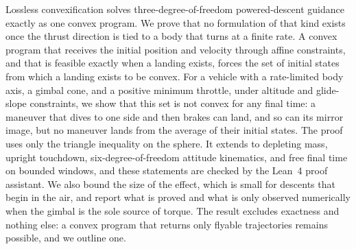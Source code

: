\begin{aiaaabstract}
Lossless convexification solves three-degree-of-freedom powered-descent guidance exactly as one convex program. We prove that
no formulation of that kind exists once the thrust direction is tied to a body that turns at a finite rate. A convex program
that receives the initial position and velocity through affine constraints, and that is feasible exactly when a landing
exists, forces the set of initial states from which a landing exists to be convex. For a vehicle with a rate-limited body
axis, a gimbal cone, and a positive minimum throttle, under altitude and glide-slope constraints, we show that this set is not
convex for any final time: a maneuver that dives to one side and then brakes can land, and so can its mirror image, but no
maneuver lands from the average of their initial states. The proof uses only the triangle inequality on the sphere. It
extends to depleting mass, upright touchdown, six-degree-of-freedom attitude kinematics, and free final time on bounded
windows, and these statements are checked by the Lean~4 proof assistant. We also bound the size of the effect, which is small
for descents that begin in the air, and report what is proved and what is only observed numerically when the gimbal is the
sole source of torque. The result excludes exactness and nothing else: a convex program that returns only flyable
trajectories remains possible, and we outline one.
\end{aiaaabstract}


